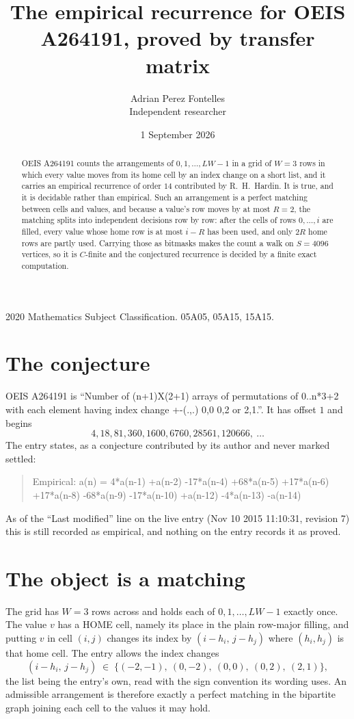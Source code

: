 \documentclass[11pt,a4paper]{article}
\title{The empirical recurrence for OEIS A264191, proved by transfer matrix}
\author{Adrian Perez Fontelles\\ \small Independent researcher}
\date{1 September 2026}
\theoremstyle{plain}
\theoremstyle{definition}
\begin{document}
\maketitle

\begin{abstract}
OEIS A264191 counts the arrangements of $0,1,\dots,LW-1$ in a grid of $W=3$ rows in which
every value moves from its home cell by an index change on a short list, and it carries an
empirical recurrence of order $14$ contributed by R.~H.~Hardin. It is true, and it is
decidable rather than empirical. Such an arrangement is a perfect matching between cells and
values, and because a value's row moves by at most $R=2$, the matching splits into
independent decisions row by row: after the cells of rows $0,\dots,i$ are filled,
every value whose home row is at most $i-R$ has been used, and only $2R$ home rows are
partly used. Carrying those as bitmasks makes the count a walk on $S=4096$ vertices, so it is
$C$-finite and the conjectured recurrence is decided by a finite exact computation.
\end{abstract}

\noindent\small 2020 Mathematics Subject Classification. 05A05, 05A15, 15A15.\normalsize

\section{The conjecture}

OEIS A264191 is ``Number of (n+1)X(2+1) arrays of permutations of 0..n*3+2 with each element having index change +-(.,.) 0,0 0,2 or 2,1.''. It has offset $1$ and begins
\[
4, 18, 81, 360, 1600, 6760, 28561, 120666,\ \dots
\]
The entry states, as a conjecture contributed by its author and never marked settled:
\begin{quote}
Empirical: a(n) = 4*a(n-1) +a(n-2) -17*a(n-4) +68*a(n-5) +17*a(n-6) +17*a(n-8) -68*a(n-9) -17*a(n-10) +a(n-12) -4*a(n-13) -a(n-14)
\end{quote}
As of the ``Last modified'' line on the live entry (Nov 10 2015 11:10:31, revision 7) this is still
recorded as empirical, and nothing on the entry records it as proved.

\section{The object is a matching}

The grid has $W=3$ rows across and holds each of $0,1,\dots,LW-1$ exactly once. The value
$v$ has a HOME cell, namely its place in the plain row-major filling, and putting $v$ in cell
$(i,j)$ changes its index by $(i-h_i,\,j-h_j)$ where $(h_i,h_j)$ is that home cell. The entry
allows the index changes
\[
(i-h_i,\,j-h_j)\;\in\;\{(-2,-1),\ (0,-2),\ (0,0),\ (0,2),\ (2,1)\},
\]
the list being the entry's own, read with the sign convention its wording uses. An admissible
arrangement is therefore exactly a perfect matching in the bipartite graph joining each cell to
the values it may hold.
\end{document}
